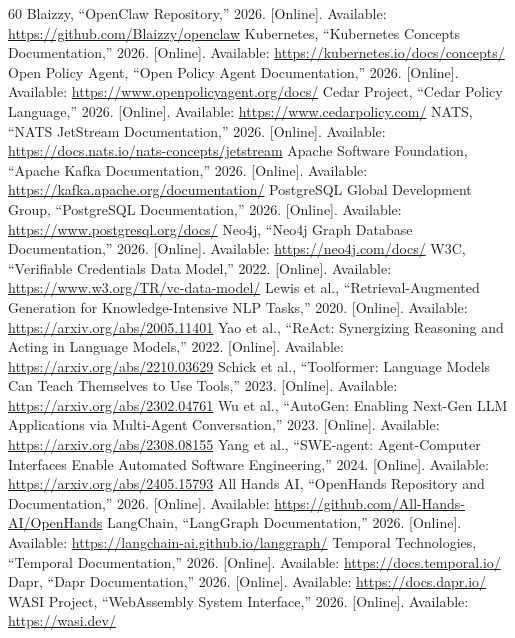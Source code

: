\documentclass[10pt,journal,onecolumn]{IEEEtran}
\begin{document}
\begin{thebibliography}{60}
 Blaizzy, ``OpenClaw Repository,'' 2026. [Online]. Available: \url{https://github.com/Blaizzy/openclaw}
 Kubernetes, ``Kubernetes Concepts Documentation,'' 2026. [Online]. Available: \url{https://kubernetes.io/docs/concepts/}
 Open Policy Agent, ``Open Policy Agent Documentation,'' 2026. [Online]. Available: \url{https://www.openpolicyagent.org/docs/}
 Cedar Project, ``Cedar Policy Language,'' 2026. [Online]. Available: \url{https://www.cedarpolicy.com/}
 NATS, ``NATS JetStream Documentation,'' 2026. [Online]. Available: \url{https://docs.nats.io/nats-concepts/jetstream}
 Apache Software Foundation, ``Apache Kafka Documentation,'' 2026. [Online]. Available: \url{https://kafka.apache.org/documentation/}
 PostgreSQL Global Development Group, ``PostgreSQL Documentation,'' 2026. [Online]. Available: \url{https://www.postgresql.org/docs/}
 Neo4j, ``Neo4j Graph Database Documentation,'' 2026. [Online]. Available: \url{https://neo4j.com/docs/}
 W3C, ``Verifiable Credentials Data Model,'' 2022. [Online]. Available: \url{https://www.w3.org/TR/vc-data-model/}
 Lewis et al., ``Retrieval-Augmented Generation for Knowledge-Intensive NLP Tasks,'' 2020. [Online]. Available: \url{https://arxiv.org/abs/2005.11401}
 Yao et al., ``ReAct: Synergizing Reasoning and Acting in Language Models,'' 2022. [Online]. Available: \url{https://arxiv.org/abs/2210.03629}
 Schick et al., ``Toolformer: Language Models Can Teach Themselves to Use Tools,'' 2023. [Online]. Available: \url{https://arxiv.org/abs/2302.04761}
 Wu et al., ``AutoGen: Enabling Next-Gen LLM Applications via Multi-Agent Conversation,'' 2023. [Online]. Available: \url{https://arxiv.org/abs/2308.08155}
 Yang et al., ``SWE-agent: Agent-Computer Interfaces Enable Automated Software Engineering,'' 2024. [Online]. Available: \url{https://arxiv.org/abs/2405.15793}
 All Hands AI, ``OpenHands Repository and Documentation,'' 2026. [Online]. Available: \url{https://github.com/All-Hands-AI/OpenHands}
 LangChain, ``LangGraph Documentation,'' 2026. [Online]. Available: \url{https://langchain-ai.github.io/langgraph/}
 Temporal Technologies, ``Temporal Documentation,'' 2026. [Online]. Available: \url{https://docs.temporal.io/}
 Dapr, ``Dapr Documentation,'' 2026. [Online]. Available: \url{https://docs.dapr.io/}
 WASI Project, ``WebAssembly System Interface,'' 2026. [Online]. Available: \url{https://wasi.dev/}

\end{thebibliography}
\end{document}
